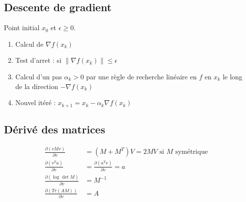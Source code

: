 \documentclass{article}
\theoremstyle{plain}%
\theoremstyle{definition}
\theoremstyle{remark}
\begin{document}
\subsection{Descente de gradient}
Point initial $ x_0 $ et $ \epsilon \geq 0 $.
\begin{enumerate}
    \item Calcul de $ \nabla f(x_k) $ 
    \item Test d'arret : si $ \left\| \nabla f(x_k) \right\| \leq \epsilon  $ 
    \item Calcul d'un pas $ \alpha _k > 0 $ par une règle de recherche linéaire en $ f $ en $ x_k $ le long de la direction $ - \nabla f(x_k) $ 
    \item Nouvel itéré : $ x_{k+1} = x_k - \alpha _k \nabla f(x_k) $ 
\end{enumerate}

\subsection{Dérivé des matrices}
\begin{align*}
    \frac{\partial (vMv)}{\partial v} &= (M + M^T)V = 2MV \text{ si } M \text{ symétrique} \\
    \frac{\partial (v^T a)}{\partial v} &= \frac{\partial (a^T v)}{\partial v} = a \\
    \frac{\partial (\log_{} \det M)}{\partial v} &= M^{-1}\\
    \frac{\partial (Tr(AM))}{\partial v} &= A
\end{align*}
\end{document}
